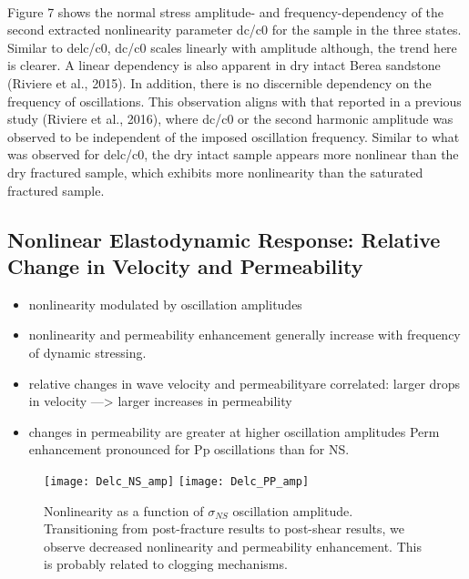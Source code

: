 \documentclass[letterpaper,10pt]{article}
\begin{document}
\paragraph{}
Figure 7 shows the normal stress amplitude- and frequency-dependency of the second extracted nonlinearity parameter dc/c0 for the sample in the three states. Similar to delc/c0, dc/c0
scales linearly with amplitude although, the trend here is clearer. A linear dependency is also apparent in dry intact Berea sandstone (Riviere et al., 2015). In addition, there is no discernible dependency on the frequency of oscillations. This observation aligns with that reported in a previous study (Riviere et al., 2016), where dc/c0 or the second harmonic amplitude was observed to be independent of the imposed oscillation frequency. Similar to what was observed for delc/c0, the dry intact sample appears more nonlinear than the dry fractured sample, which exhibits more nonlinearity than the saturated fractured sample.  

\newpage


\subsection{Nonlinear Elastodynamic Response: Relative Change in Velocity and Permeability}
\begin{itemize}
	\item nonlinearity modulated by oscillation amplitudes
\item nonlinearity and permeability enhancement generally increase with frequency of dynamic stressing.
\item relative changes in wave velocity and permeabilityare correlated: larger drops in velocity —> larger increases in permeability
\item changes in permeability are greater at higher oscillation amplitudes 
\subitem Perm enhancement pronounced for Pp oscillations than for NS.
\end{itemize}


\begin{figure}[ht]
	\centering
	\texttt{[image: Delc\_NS\_amp]}
	\texttt{[image: Delc\_PP\_amp]}
	\caption{Nonlinearity as a function of $ \sigma_{NS} $ oscillation amplitude. Transitioning from post-fracture results to post-shear results, we observe decreased nonlinearity and permeability enhancement. This is probably related to clogging mechanisms.}%
	\label{fig:delc_ns_amp}
\end{figure}
\end{document}
